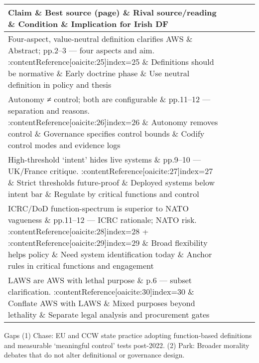 
\begin{tabular}{p{3.2cm}p{4.2cm}p{3.6cm}p{3.2cm}p{4.2cm}}
	\textbf{Claim} \& \textbf{Best source (page)} \& \textbf{Rival source/reading} \& \textbf{Condition} \& \textbf{Implication for Irish DF}\\\hline
	Four-aspect, value-neutral definition clarifies AWS \& Abstract; pp.2–3 — four aspects and aim. {\small :contentReference[oaicite:25]{index=25}} \& Definitions should be normative \& Early doctrine phase \& Use neutral definition in policy and thesis \\
	Autonomy ≠ control; both are configurable \& pp.11–12 — separation and reasons. {\small :contentReference[oaicite:26]{index=26}} \& Autonomy removes control \& Governance specifies control bounds \& Codify control modes and evidence logs \\
	High-threshold ‘intent’ hides live systems \& pp.9–10 — UK/France critique. {\small :contentReference[oaicite:27]{index=27}} \& Strict thresholds future-proof \& Deployed systems below intent bar \& Regulate by critical functions and control \\
	ICRC/DoD function-spectrum is superior to NATO vagueness \& pp.11–12 — ICRC rationale; NATO risk. {\small :contentReference[oaicite:28]{index=28} {\tiny +} :contentReference[oaicite:29]{index=29}} \& Broad flexibility helps policy \& Need system identification today \& Anchor rules in critical functions and engagement \\
	LAWS are AWS with lethal purpose \& p.6 — subset clarification. {\small :contentReference[oaicite:30]{index=30}} \& Conflate AWS with LAWS \& Mixed purposes beyond lethality \& Separate legal analysis and procurement gates \\\hline
\end{tabular}


Gaps
(1) Chase: EU and CCW state practice adopting function-based definitions and measurable ‘meaningful control’ tests post-2022.
(2) Park: Broader morality debates that do not alter definitional or governance design.

\parencite{PORAT_2016}

